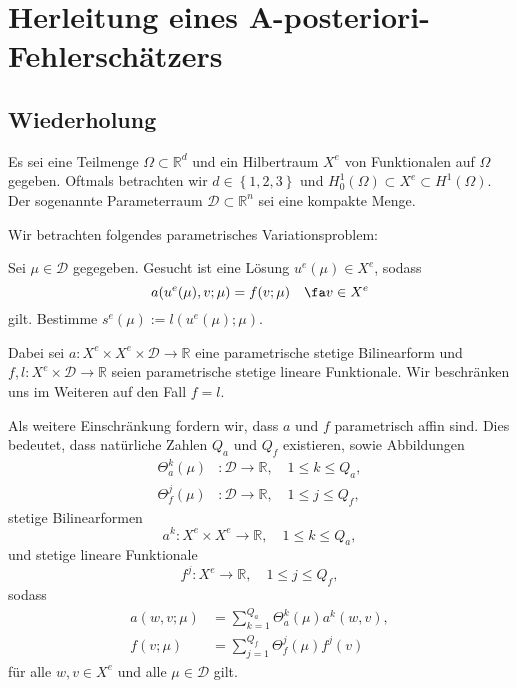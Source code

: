 
\section{Herleitung eines A-posteriori-Fehlerschätzers} %
\label{sec:herleitung}


\subsection{Wiederholung} %
\label{sub:wiederholung}

Es sei eine Teilmenge $\Omega \subset \mathbb{R}^d$ und ein Hilbertraum $X^e$ von Funktionalen auf $\Omega$ gegeben.
Oftmals betrachten wir $d \in \left\{ 1, 2, 3 \right\}$ und $H^1_0(\Omega) \subset X^e \subset H^1(\Omega)$.
Der sogenannte Parameterraum $\mathcal D \subset \mathbb{R}^n$ sei eine kompakte Menge.

Wir betrachten folgendes parametrisches Variationsproblem:
\begin{addmargin}[2em]{2em}
    Sei $\mu \in \mathcal D$ gegegeben. Gesucht ist eine Lösung $u^e(\mu) \in X^e$, sodass
    \begin{equation}
        a(u^e(\mu), v; \mu) = f(v; \mu) \quad \fa v \in X^e
    \end{equation}
    gilt.
    Bestimme $s^e(\mu) := l(u^e(\mu); \mu)$.
\end{addmargin}
Dabei sei $a \colon X^e \times X^e \times \mathcal D \to \mathbb{R}$ eine parametrische stetige Bilinearform und $f, l \colon X^e \times \mathcal D \to \mathbb{R}$ seien parametrische stetige lineare Funktionale.
Wir beschränken uns im Weiteren auf den Fall $f = l$.

Als weitere Einschränkung fordern wir, dass $a$ und $f$ parametrisch affin sind.
Dies bedeutet, dass natürliche Zahlen $Q_a$ und $Q_f$ existieren, sowie Abbildungen
\begin{align}
    \Theta_a^k(\mu) &\colon \mathcal D \to \mathbb{R}, \quad 1 \leq k \leq Q_a, \\
    \Theta_f^j(\mu) &\colon \mathcal D \to \mathbb{R}, \quad 1 \leq j \leq Q_f,
\end{align}
stetige Bilinearformen
\begin{equation}
    a^k \colon X^e \times X^e \to \mathbb{R}, \quad 1 \leq k \leq Q_a,
\end{equation}
und stetige lineare Funktionale
\begin{equation}
    f^j \colon X^e \to \mathbb{R}, \quad 1 \leq j \leq Q_f,
\end{equation}
sodass
\begin{align*}
    a(w, v; \mu) &= \sum_{k=1}^{Q_a} \Theta_a^k(\mu) a^k(w, v), \\
    f(v; \mu)    &= \sum_{j=1}^{Q_f} \Theta_f^j(\mu) f^j(v)
\end{align*}
für alle $w, v \in X^e$ und alle $\mu \in \mathcal D$ gilt.


